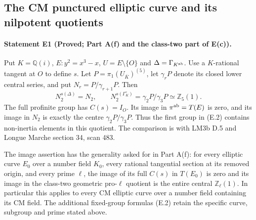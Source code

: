 \subsection{The CM punctured elliptic curve and its nilpotent quotients}
\paragraph{Statement E1 (Proved; Part A(f) and the class-two part of E(c)).}\label{res:E1}
Put $K=\mathbb Q(i)$, $E:y^2=x^3-x$, $U=E\setminus\{O\}$ and $\Delta=\Gamma_{K^{\rm ab}}$. Use a $K$-rational tangent at $O$ to define $s$. Let $P=\pi_1(U_{\overline K})^{(5)}$, let $\gamma_rP$ denote its closed lower central series, and put $N_r=P/\gamma_{r+1}P$. Then
\[
 N_2^{s(\Delta)}=N_2,\qquad
 N_2^{s(\Gamma_K^\circ)}=\gamma_2P/\gamma_3P\simeq\mathbb Z_5(1).
 \tag{E.2}
\]
The full profinite group has $C(s)=I_O$. Its image in $\pi^{\rm ab}=T(E)$ is zero, and its image in $N_2$ is exactly the centre $\gamma_2P/\gamma_3P$. Thus the first group in (E.2) contains non-inertia elements in this quotient. The comparison is with LM3b D.5 and Longue Marche section 34, scan 483.

The image assertion has the generality asked for in Part A(f): for every
elliptic curve $E_0$ over a number field $K_0$, every rational tangential
section at its removed origin, and every prime $\ell$, the image of its
full $C(s)$ in $T(E_0)$ is zero and its image in the class-two geometric
pro-$\ell$ quotient is the entire central $\mathbb Z_\ell(1)$.
In particular this applies to every CM elliptic curve over a number field
containing its CM field. The additional fixed-group formulas (E.2) retain
the specific curve, subgroup and prime stated above.

